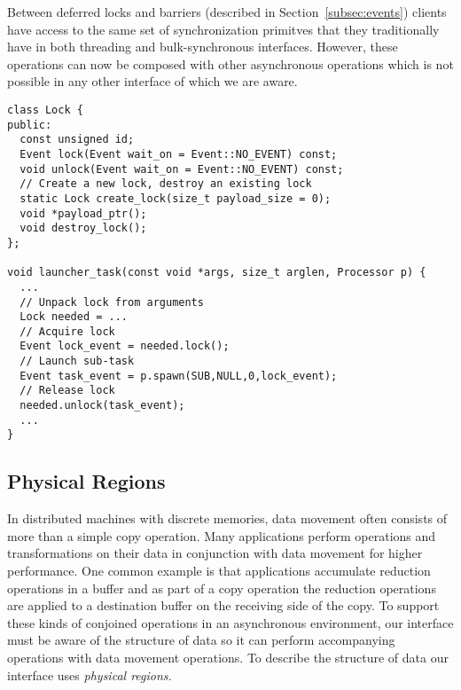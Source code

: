 Between deferred locks and barriers (described in Section~\ref{subsec:events}) clients 
have access to the same set of synchronization primitves that they traditionally have
in both threading and bulk-synchronous interfaces.  However, these operations can now 
be composed with other asynchronous operations which is not possible in any other interface
of which we are aware.



\begin{lstlisting}[float={t},label={lst:lockapi},caption={Deferred Lock Interface and Example.}]
class Lock {
public:
  const unsigned id;
  Event lock(Event wait_on = Event::NO_EVENT) const;
  void unlock(Event wait_on = Event::NO_EVENT) const;
  // Create a new lock, destroy an existing lock
  static Lock create_lock(size_t payload_size = 0);
  void *payload_ptr();
  void destroy_lock();
};

void launcher_task(const void *args, size_t arglen, Processor p) {
  ...
  // Unpack lock from arguments
  Lock needed = ...
  // Acquire lock
  Event lock_event = needed.lock();
  // Launch sub-task
  Event task_event = p.spawn(SUB,NULL,0,lock_event);
  // Release lock
  needed.unlock(task_event);
  ...
}
\end{lstlisting}

\subsection{Physical Regions}
\label{subsec:phyreg}
In distributed machines with discrete memories, data movement often consists of more
than a simple copy operation.  Many applications perform operations and transformations on
their data in conjunction with data movement for higher performance.  One common example is 
that applications accumulate reduction operations in a buffer and as part of a copy operation 
the reduction operations are applied to a destination buffer on the receiving side of the copy.  
To support these kinds of conjoined operations in an asynchronous environment, our interface 
must be aware of the structure of data so it can perform accompanying operations with 
data movement operations.  To describe the structure of data our interface uses {\em physical regions.}

